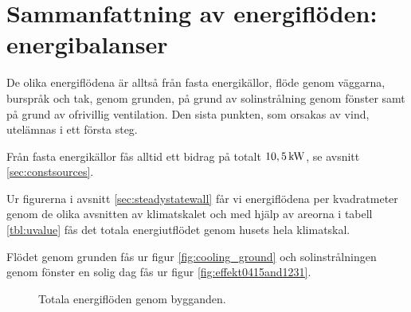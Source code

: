 \section{Sammanfattning av energiflöden: energibalanser}

De olika energiflödena är alltså från fasta energikällor, flöde genom väggarna, burspråk och tak, genom grunden, på grund av solinstrålning genom fönster samt på grund av ofrivillig ventilation. Den sista punkten, som orsakas av vind, utelämnas i ett första steg.

Från fasta energikällor fås alltid ett bidrag på totalt $\unit[10,5]{kW}$, se avsnitt \ref{sec:constsources}.

Ur figurerna i avsnitt \ref{sec:steadystatewall} får vi energiflödena per kvadratmeter genom de olika avsnitten av klimatskalet och med hjälp av areorna i tabell \ref{tbl:uvalue} fås det totala energiutflödet genom husets hela klimatskal.

Flödet genom grunden fås ur figur \ref{fig:cooling_ground} och solinstrålningen genom fönster en solig dag fås ur figur \ref{fig:effekt0415and1231}.


\begin{figure}[hpbt]
\centering
{}


\caption{\label{fig:energyflow_sum} Totala energiflöden genom bygganden.}
\end{figure}
